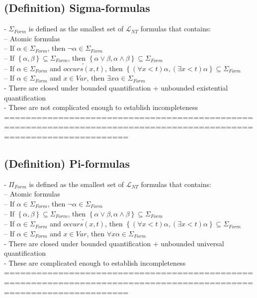 \documentclass{book}
\newcommand{\pnot}[1]{\widetilde{#1}}
\newcommand{\occurs}[2]{occurs(#1, #2)}
\newcommand{\set}[1]{\left\{ #1 \right\}}
\begin{document}
\subsection{(Definition) Sigma-formulas} %
	- $\Sigma_{Form}$ is defined as the smallest set of $\mathcal{L}_{NT}$ formulas that contains: \\
		-- Atomic formulas \\
		-- If $\alpha \in \Sigma_{Form}$, then $\lnot \alpha \in \Sigma_{Form}$ \\
		-- If $\set{\alpha, \beta} \subseteq \Sigma_{Form}$, then $\set{\alpha \lor \beta, \alpha \land \beta} \subseteq \Sigma_{Form}$ \\
		-- If $\alpha \in \Sigma_{Form}$ and $\pnot{\occurs{x}{t}}$, then $\set{(\forall x < t) \alpha, (\exists x < t) \alpha} \subseteq \Sigma_{Form}$ \\
		-- If $\alpha \in \Sigma_{Form}$ and $x \in Var$, then $\exists x \alpha \in \Sigma_{Form}$ \\
	- There are closed under bounded quantification + unbounded existential quantification \\
	- These are not complicated enough to establish incompleteness \\
	===================================================================================================================
\subsection{(Definition) Pi-formulas} %
	- $\Pi_{Form}$ is defined as the smallest set of $\mathcal{L}_{NT}$ formulas that contains: \\
		-- Atomic formulas \\
		-- If $\alpha \in \Sigma_{Form}$, then $\lnot \alpha \in \Sigma_{Form}$ \\
		-- If $\set{\alpha, \beta} \subseteq \Sigma_{Form}$, then $\set{\alpha \lor \beta, \alpha \land \beta} \subseteq \Sigma_{Form}$ \\
		-- If $\alpha \in \Sigma_{Form}$ and $\pnot{\occurs{x}{t}}$, then $\set{(\forall x < t) \alpha, (\exists x < t) \alpha} \subseteq \Sigma_{Form}$ \\
		-- If $\alpha \in \Sigma_{Form}$ and $x \in Var$, then $\forall	x \alpha \in \Sigma_{Form}$ \\
	- There are closed under bounded quantification + unbounded universal quantification \\
	- These are complicated enough to establish incompleteness \\
	===================================================================================================================
\end{document}
